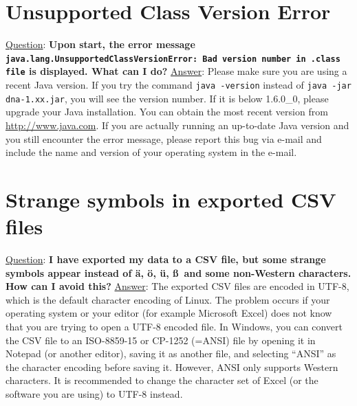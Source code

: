 \documentclass[12pt,a4paper]{scrreprt}
\newcommand{\code}[1]{\texttt{#1}}
\begin{document}
\section{Unsupported Class Version Error}\label{faq:unsupportedversion}
\underline{Question}: \textbf{Upon start, the error message \code{java.lang.Un\-sup\-port\-ed\-Class\-Ver\-sion\-Er\-ror: Bad version number in .class file} is displayed. What can I do?}
\vspace{0.3cm} \newline
\underline{Answer}: Please make sure you are using a recent Java version. If you try the command \code{java -version} instead of \code{java -jar dna-1.xx.jar}, you will see the version number. If it is below 1.6.0\_0, please upgrade your Java installation. You can obtain the most recent version from \url{http://www.java.com}. If you are actually running an up-to-date Java version and you still encounter the error message, please report this bug via e-mail and include the name and version of your operating system in the e-mail.

\section{Strange symbols in exported CSV files}
\underline{Question}: \textbf{I have exported my data to a CSV file, but some strange symbols appear instead of \"a, \"o, \"u, \ss\ and some non-Western characters. How can I avoid this?}
\vspace{0.3cm} \newline
\underline{Answer}: The exported CSV files are encoded in UTF-8, which is the default character encoding of Linux. The problem occurs if your operating system or your editor (for example Microsoft Excel) does not know that you are trying to open a UTF-8 encoded file. In Windows, you can convert the CSV file to an ISO-8859-15 or CP-1252 (=ANSI) file by opening it in Notepad (or another editor), saving it as another file, and selecting ``ANSI'' as the character encoding before saving it. However, ANSI only supports Western characters. It is recommended to change the character set of Excel (or the software you are using) to UTF-8 instead.
\end{document}

